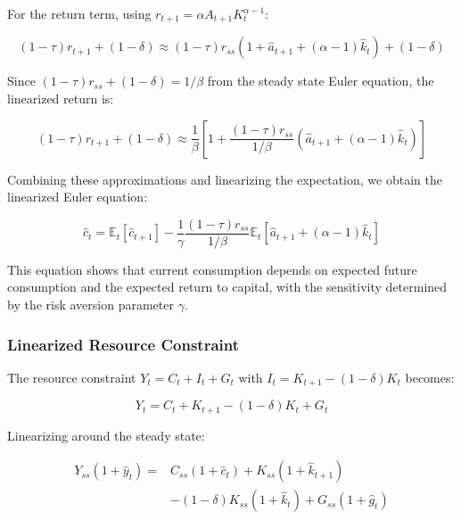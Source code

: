 \documentclass[5p,authoryear]{elsarticle}
\begin{document}
For the return term, using $r_{t+1} = \alpha A_{t+1} K_t^{\alpha-1}$:

\begin{equation}
(1-\tau) r_{t+1} + (1-\delta) \approx (1-\tau) r_{ss} (1 + \hat{a}_{t+1} + (\alpha-1) \hat{k}_t) + (1-\delta)
\label{eq:return_approx}
\end{equation}

Since $(1-\tau) r_{ss} + (1-\delta) = 1/\beta$ from the steady state Euler equation, the linearized return is:

\begin{equation}
(1-\tau) r_{t+1} + (1-\delta) \approx \frac{1}{\beta} \left[ 1 + \frac{(1-\tau) r_{ss}}{1/\beta} (\hat{a}_{t+1} + (\alpha-1) \hat{k}_t) \right]
\label{eq:return_linearized}
\end{equation}

Combining these approximations and linearizing the expectation, we obtain the linearized Euler equation:

\begin{equation}
\hat{c}_t = \mathbb{E}_t [\hat{c}_{t+1}] - \frac{1}{\gamma} \frac{(1-\tau) r_{ss}}{1/\beta} \mathbb{E}_t [\hat{a}_{t+1} + (\alpha-1) \hat{k}_t]
\label{eq:linearized_euler}
\end{equation}

This equation shows that current consumption depends on expected future consumption and the expected return to capital, with the sensitivity determined by the risk aversion parameter $\gamma$.

\subsubsection{Linearized Resource Constraint}

The resource constraint $Y_t = C_t + I_t + G_t$ with $I_t = K_{t+1} - (1-\delta) K_t$ becomes:

\begin{equation}
Y_t = C_t + K_{t+1} - (1-\delta) K_t + G_t
\label{eq:resource_nonlinear}
\end{equation}

Linearizing around the steady state:

\begin{align}
Y_{ss}(1 + \hat{y}_t) = &C_{ss}(1 + \hat{c}_t) + K_{ss}(1 + \hat{k}_{t+1}) \nonumber\\
&- (1-\delta) K_{ss}(1 + \hat{k}_t) + G_{ss}(1 + \hat{g}_t)
\label{eq:resource_linearizing}
\end{align}
\end{document}
